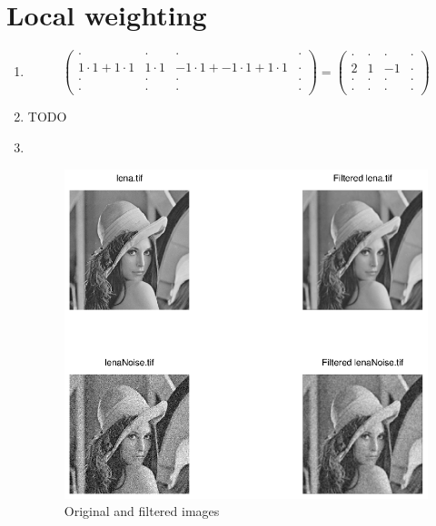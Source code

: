 \documentclass[DIN, pagenumber=false, fontsize=11pt, parskip=half]{scrartcl}
\begin{document}
    \section{Local weighting}
    \begin{enumerate}
        \item 
            \begin{equation*}
                \begin{pmatrix}
                    \cdot & \cdot & \cdot & \cdot \\
                    1 \cdot 1 + 1 \cdot 1 & 1 \cdot 1 & -1 \cdot 1 + -1 \cdot 1 + 1 \cdot 1  & \cdot \\
                    \cdot & \cdot & \cdot & \cdot \\
                    \cdot & \cdot & \cdot & \cdot
                \end{pmatrix} =
                \begin{pmatrix}
                    \cdot & \cdot & \cdot & \cdot \\
                    2 & 1 & -1 & \cdot \\
                    \cdot & \cdot & \cdot & \cdot \\
                    \cdot & \cdot & \cdot & \cdot
                \end{pmatrix}
            \end{equation*}
        \item TODO
        \item $ $ 
            \begin{figure}[H]
                \centering
                \includegraphics[trim = {0 9cm 27cm 0}, clip,width=\textwidth]{BoxFilter}
                \caption{Original and filtered images}
            \end{figure} 
    \end{enumerate}
\end{document}
